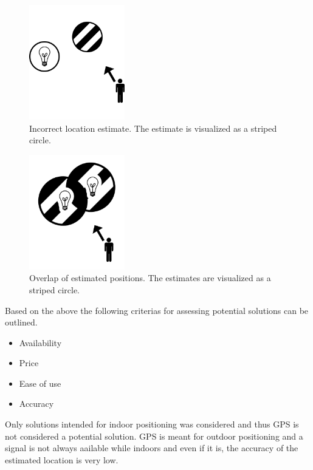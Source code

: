 \begin{figure}[h]
\centering
\includegraphics[height=5cm]{images/incorrect-positioning-estimate.png}
\caption{Incorrect location estimate. The estimate is visualized as a striped circle.}
\label{fig:indoor-positioning:incorrect}
\end{figure}

\begin{figure}[h]
\centering
\includegraphics[height=5cm]{images/positioning-overlap.png}
\caption{Overlap of estimated positions. The estimates are visualized as a striped circle.}
\label{fig:indoor-positioning:overlap}
\end{figure}

Based on the above the following criterias for assessing potential solutions can be outlined.

\begin{itemize}
\item Availability
\item Price
\item Ease of use
\item Accuracy
\end{itemize}

Only solutions intended for indoor positioning was considered and thus GPS is not considered a potential solution. GPS is meant for outdoor positioning and a signal is not always aailable while indoors and even if it is, the accuracy of the estimated location is very low.

